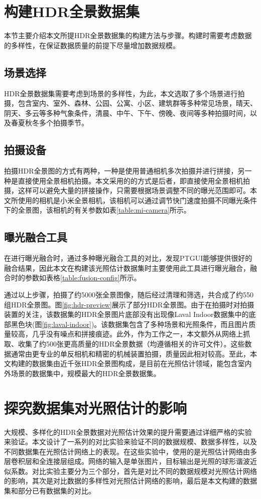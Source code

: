 \section{构建HDR全景数据集}

本节主要介绍本文所提HDR全景数据集的构建方法与步骤。构建时需要考虑数据的多样性，在保证数据质量的前提下尽量增加数据规模。
\subsection{场景选择}
HDR全景数据集需要考虑到场景的多样性，为此，本文选取了多个场景进行拍摄，包含室内、室外、森林、公园、公寓、小区、建筑群等多种常见场景，晴天、阴天、多云等多种气象条件，清晨、中午、下午、傍晚、夜间等多种拍摄时间，以及春夏秋冬多个拍摄季节。
\subsection{拍摄设备}
拍摄HDR全景图的方式有两种，一种是使用普通相机多次拍摄并进行拼接，另一种是直接使用全景相机拍摄。本文采用的的方式是后者，即直接使用全景相机拍摄，这样可以避免大量的拼接操作，只需要根据场景调整不同的曝光范围即可。本文所使用的相机是小米全景相机\cite{xiaomi}，该相机可以通过调节快门速度拍摄不同曝光条件下的全景图，该相机的有关参数如表\ref{table:mi-camera}所示。
\subsection{曝光融合工具}
在进行曝光融合时，通过多种曝光融合工具的对比，发现PTGUI\cite{ptgui}能够提供很好的融合结果，因此本文在构建该光照估计数据集时主要使用此工具进行曝光融合，融合时的参数如表格\ref{table:fusion-config}所示。


通过以上步骤，拍摄了约5000张全景图像，随后经过清理和筛选，共合成了约550组HDR全景图。图\ref{fig:hdr-preview}展示了部分HDR全景图。由于在拍摄时对拍摄装置的关注，该数据集的HDR全景图片底部没有出现像Laval Indoor数据集\cite{gardner2017learning}中的底部黑色块(图\ref{fig:laval-indoor})。该数据集包含了多种场景和光照条件，而且图片质量较高，几乎没有噪点和拼接痕迹。此外，作为工作之一，本文额外从网络上抓取、收集了约500张更高质量的HDR全景数据（均遵循相关的许可文件）。这些数据通常由更专业的单反相机和精密的机械装置拍摄，质量因此相对较高。至此，本文构建的数据集由近千张HDR全景图构成，是目前在光照估计领域，能包含室内外场景的数据集中，规模最大的HDR全景数据集。
\section{探究数据集对光照估计的影响}
大规模、多样化的HDR全景数据对光照估计效果的提升需要通过详细严格的实验来验证。本文设计了一系列的对比实验来验证不同的数据规模、数据多样性，以及不同数据集在光照估计网络上的表现。在这些实验中，使用的是光照估计网络由多层卷积层和全连接层组成。网络的输入是单张图片，目标输出是光照的球形谐波近似系数。对比实验主要分为三个部分，首先是对比不同的数据规模对光照估计网络的影响，其次是对比数据的多样性对光照估计网络的影响，最后是本文构建的数据集和部分已有数据集的对比。

